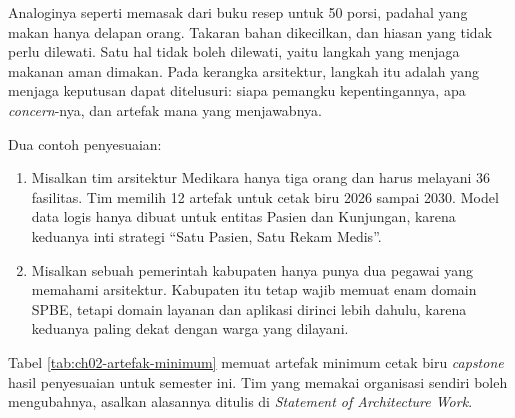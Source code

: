 Analoginya seperti memasak dari buku resep untuk 50 porsi, padahal yang
makan hanya delapan orang. Takaran bahan dikecilkan, dan hiasan yang tidak
perlu dilewati. Satu hal tidak boleh dilewati, yaitu langkah yang menjaga
makanan aman dimakan. Pada kerangka arsitektur, langkah itu adalah yang
menjaga keputusan dapat ditelusuri: siapa pemangku kepentingannya, apa
\textit{concern}-nya, dan artefak mana yang menjawabnya.

Dua contoh penyesuaian:

\begin{enumerate}
  \item Misalkan tim arsitektur Medikara hanya tiga orang dan harus melayani
        36 fasilitas. Tim memilih 12 artefak untuk cetak biru 2026 sampai
        2030. Model data logis hanya dibuat untuk entitas Pasien dan
        Kunjungan, karena keduanya inti strategi ``Satu Pasien, Satu Rekam
        Medis''.
  \item Misalkan sebuah pemerintah kabupaten hanya punya dua pegawai yang
        memahami arsitektur. Kabupaten itu tetap wajib memuat enam domain
        SPBE, tetapi domain layanan dan aplikasi dirinci lebih dahulu, karena
        keduanya paling dekat dengan warga yang dilayani.
\end{enumerate}

Tabel \ref{tab:ch02-artefak-minimum} memuat artefak minimum cetak biru
\textit{capstone} hasil penyesuaian untuk semester ini. Tim yang memakai
organisasi sendiri boleh mengubahnya, asalkan alasannya ditulis di
\textit{Statement of Architecture Work}.


